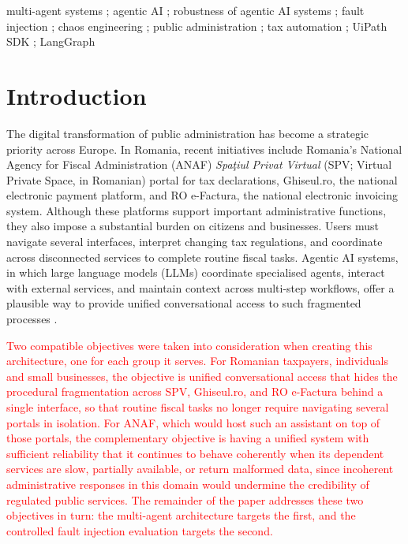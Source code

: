 \documentclass[3p,times,procedia]{elsarticle}
\begin{document}
\begin{frontmatter}
\begin{abstract}
month for a large agency handling 5{,}000 daily interactions. \textbf{CONCLUSION:} The 63\% silent pass-through rate motivates output-level contract verification as a necessary complement to agentic systems deployed in regulated public services. The implementation and evaluation artefacts are released publicly to support reproducibility and further research.
\end{abstract}
\begin{keyword}
multi-agent systems ; agentic AI ; robustness of agentic AI systems ; fault injection ; chaos engineering ; public administration ; tax automation ; UiPath SDK ; LangGraph
\end{keyword}

\end{frontmatter}

\section{Introduction}
\label{sec:introduction}

The digital transformation of public administration has become a strategic priority across Europe. In Romania, recent initiatives include Romania's National Agency for Fiscal Administration (ANAF) \textit{Spa\c{t}iul Privat Virtual} (SPV; Virtual Private Space, in Romanian) portal for tax declarations, Ghiseul.ro, the national electronic payment platform, and RO e-Factura, the national electronic invoicing system. Although these platforms support important administrative functions, they also impose a substantial burden on citizens and businesses. Users must navigate several interfaces, interpret changing tax regulations, and coordinate across disconnected services to complete routine fiscal tasks. Agentic AI systems, in which large language models (LLMs) coordinate specialised agents, interact with external services, and maintain context across multi-step workflows, offer a plausible way to provide unified conversational access to such fragmented processes \cite{Pan2025, WEF2025}.

\textcolor{red}{Two compatible objectives were taken into consideration when creating this architecture, one for each group it serves. For Romanian taxpayers, individuals and small businesses, the objective is unified conversational access that hides the procedural fragmentation across SPV, Ghiseul.ro, and RO e-Factura behind a single interface, so that routine fiscal tasks no longer require navigating several portals in isolation. For ANAF, which would host such an assistant on top of those portals, the complementary objective is having a unified system with sufficient reliability that it continues to behave coherently when its dependent services are slow, partially available, or return malformed data, since incoherent administrative responses in this domain would undermine the credibility of regulated public services. The remainder of the paper addresses these two objectives in turn: the multi-agent architecture targets the first, and the controlled fault injection evaluation targets the second.}
\end{document}
